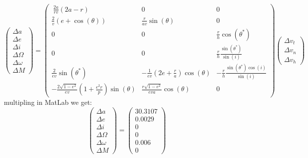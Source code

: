 \documentclass[11pt, a4paper]{article}
\begin{document}
\begin{equation}
    \begin{pmatrix}
        \Delta a\\
        \Delta e\\
        \Delta i\\
        \Delta \Omega\\
        \Delta \omega\\
        \Delta M
    \end{pmatrix}
    = \begin{pmatrix}\
        \frac{2a}{rv}\left(2a-r\right) & 0 & 0 \\
        \frac{2}{v}\left(e+\cos\left(\theta\right)\right) & \frac{r}{av}\sin\left(\theta\right) & 0 \\
        0 & 0 & \frac{r}{h}\cos\left(\theta^*\right) \\
        0 & 0 & \frac{r}{h}\frac{\sin\left(\theta^*\right)}{\sin\left(i\right)} \\
        \frac{2}{ev}\sin\left(\theta^*\right) & -\frac{1}{ev}\left(2e+\frac{r}{a}\right)\cos\left(\theta\right) &  -\frac{r}{h}\frac{\sin\left(\theta^*\right)\cos\left(i\right)}{\sin\left(i\right)} \\
        -\frac{2\sqrt{1-e^2}}{ev}\left(1+\frac{e^2r}{p}\right)\sin\left(\theta\right) & \frac{r\sqrt{1-e^2}}{eva}\cos\left(\theta\right) & 0

    \end{pmatrix}
    \begin{pmatrix}
        \Delta v_t \\
        \Delta v_n \\
        \Delta v_h
    \end{pmatrix}
\end{equation}
multipling in MatLab we get:
\begin{equation}
    \begin{pmatrix}
        \Delta a\\
        \Delta e\\
        \Delta i\\
        \Delta \Omega\\
        \Delta \omega\\
        \Delta M
    \end{pmatrix}
    =
    \begin{pmatrix}
        30.3107 \\
        0.0029 \\ 
        0 \\ 
        0 \\
        0.006 \\ 
        0
    \end{pmatrix}
\end{equation}
\end{document}
